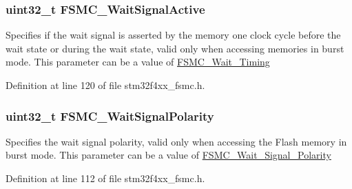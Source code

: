 \hypertarget{struct_f_s_m_c___n_o_r_s_r_a_m_init_type_def_aef0e381a5fbf637ad892903889a63583}{
\subsubsection[{F\-S\-M\-C\-\_\-\-Wait\-Signal\-Active}]{\setlength{\rightskip}{0pt plus 5cm}uint32\-\_\-t F\-S\-M\-C\-\_\-\-Wait\-Signal\-Active}}\label{struct_f_s_m_c___n_o_r_s_r_a_m_init_type_def_aef0e381a5fbf637ad892903889a63583}
Specifies if the wait signal is asserted by the memory one clock cycle before the wait state or during the wait state, valid only when accessing memories in burst mode. This parameter can be a value of \hyperlink{group___f_s_m_c___wait___timing}{F\-S\-M\-C\-\_\-\-Wait\-\_\-\-Timing} 

Definition at line 120 of file stm32f4xx\-\_\-fsmc.\-h.

\hypertarget{struct_f_s_m_c___n_o_r_s_r_a_m_init_type_def_a1b4af656a06371a567ccf494274c1261}{
\subsubsection[{F\-S\-M\-C\-\_\-\-Wait\-Signal\-Polarity}]{\setlength{\rightskip}{0pt plus 5cm}uint32\-\_\-t F\-S\-M\-C\-\_\-\-Wait\-Signal\-Polarity}}\label{struct_f_s_m_c___n_o_r_s_r_a_m_init_type_def_a1b4af656a06371a567ccf494274c1261}
Specifies the wait signal polarity, valid only when accessing the Flash memory in burst mode. This parameter can be a value of \hyperlink{group___f_s_m_c___wait___signal___polarity}{F\-S\-M\-C\-\_\-\-Wait\-\_\-\-Signal\-\_\-\-Polarity} 

Definition at line 112 of file stm32f4xx\-\_\-fsmc.\-h.

